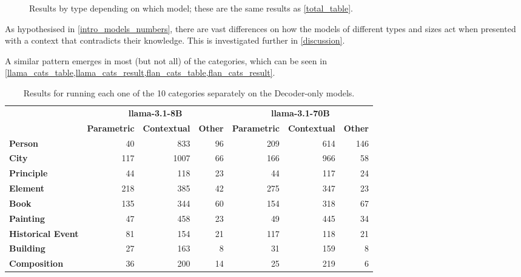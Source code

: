 \begin{figure}[H]
	\centering
	\caption{Results by type depending on which model; these are the same results as \cref{total_table}.}
	\label{total_results}
\end{figure}

As hypothesised in \cref{intro_models_numbers}, there are vast differences on how the models of different types and sizes act when presented with a context that contradicts their knowledge.
This is investigated further in \cref{discussion}.

A similar pattern emerges in most (but not all) of the categories, which can be seen in \cref{llama_cats_table,llama_cats_result,flan_cats_table,flan_cats_result}.

\begin{table}[htbp]
	\centering
	\footnotesize
	\begin{tabular}{>{\bfseries}l | r r r | r r r}
		\toprule
			& \multicolumn{3}{c|}{\ttfamily \bfseries llama-3.1-8B} & \multicolumn{3}{c}{\ttfamily \bfseries llama-3.1-70B} \\
			& \bfseries Parametric & \bfseries Contextual & \bfseries Other & \bfseries Parametric & \bfseries Contextual & \bfseries Other \\
		\midrule
			Person           &  40 &  833 & 96 & 209 & 614 & 146 \\
			City             & 117 & 1007 & 66 & 166 & 966 &  58 \\
			Principle        &  44 &  118 & 23 &  44 & 117 &  24 \\
			Element          & 218 &  385 & 42 & 275 & 347 &  23 \\
			Book             & 135 &  344 & 60 & 154 & 318 &  67 \\
			Painting         &  47 &  458 & 23 &  49 & 445 &  34 \\
			Historical Event &  81 &  154 & 21 & 117 & 118 &  21 \\
			Building         &  27 &  163 &  8 &  31 & 159 &   8 \\
			Composition      &  36 &  200 & 14 &  25 & 219 &   6 \\
		\bottomrule
	\end{tabular}
	\caption{Results for running each one of the 10 categories separately on the Decoder-only models.}
	\label{llama_cats_table}
\end{table}

